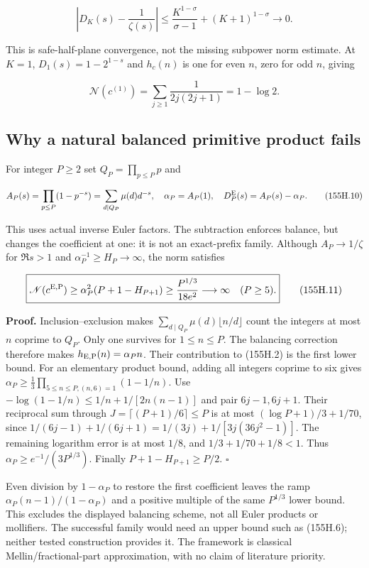 \documentclass[
  11pt,
]{book}
\begin{document}
\[
\left|D_K(s)-\frac1{\zeta(s)}\right|
\le\frac{K^{1-\sigma}}{\sigma-1}+(K+1)^{1-\sigma}\longrightarrow0.
\tag{155H.8}
\]

This is safe-half-plane convergence, not the missing subpower norm
estimate. At \(K=1\), \(D_1(s)=1-2^{1-s}\) and \(h_c(n)\) is one for
even \(n\), zero for odd \(n\), giving

\[
 \mathscr N(c^{(1)})=\sum_{j\ge1}\frac1{2j(2j+1)}=1-\log2.
\tag{155H.9}
\]

\subsection{Why a natural balanced primitive product
fails}\label{why-a-natural-balanced-primitive-product-fails}

For integer \(P\ge2\) set \(Q_P=\prod_{p\le P}p\) and

\[
 A_P(s)=\prod_{p\le P}(1-p^{-s})=\sum_{d\mid Q_P}\mu(d)d^{-s},
 \quad\alpha_P=A_P(1),\quad D_P^{\rm E}(s)=A_P(s)-\alpha_P.
\tag{155H.10}
\]

This uses actual inverse Euler factors. The subtraction enforces
balance, but changes the coefficient at one: it is not an exact-prefix
family. Although \(A_P\to1/\zeta\) for \(\Re s>1\) and
\(\alpha_P^{-1}\ge H_P\to\infty\), the norm satisfies

\[
\boxed{\mathscr N(c^{\rm E,P})
\ge\alpha_P^2(P+1-H_{P+1})
\ge\frac{P^{1/3}}{18e^2}\longrightarrow\infty\quad(P\ge5).}
\tag{155H.11}
\]

\textbf{Proof.} Inclusion--exclusion makes
\(\sum_{d\mid Q_P}\mu(d)\lfloor n/d\rfloor\) count the integers at most
\(n\) coprime to \(Q_P\). Only one survives for \(1\le n\le P\). The
balancing correction therefore makes \(h_{\rm E,P}(n)=\alpha_P n\).
Their contribution to (155H.2) is the first lower bound. For an
elementary product bound, adding all integers coprime to six gives
\(\alpha_P\ge\tfrac13\prod_{5\le n\le P,(n,6)=1}(1-1/n)\). Use
\(-\log(1-1/n)\le1/n+1/[2n(n-1)]\) and pair \(6j-1,6j+1\). Their
reciprocal sum through \(J=\lceil(P+1)/6\rceil\le P\) is at most
\((\log P+1)/3+1/70\), since
\(1/(6j-1)+1/(6j+1)=1/(3j)+1/[3j(36j^2-1)]\). The remaining logarithm
error is at most \(1/8\), and \(1/3+1/70+1/8<1\). Thus
\(\alpha_P\ge e^{-1}/(3P^{1/3})\). Finally \(P+1-H_{P+1}\ge P/2\).
\(\square\)

Even division by \(1-\alpha_P\) to restore the first coefficient leaves
the ramp \(\alpha_P(n-1)/(1-\alpha_P)\) and a positive multiple of the
same \(P^{1/3}\) lower bound. This excludes the displayed balancing
scheme, not all Euler products or mollifiers. The successful family
would need an upper bound such as (155H.6); neither tested construction
provides it. The framework is classical Mellin/fractional-part
approximation, with no claim of literature priority.
\end{document}
